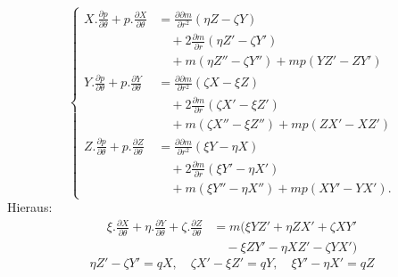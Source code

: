 \begin{equation}\tag{3}
\left\{\begin{aligned}
X.\frac{\partial p}{\partial\theta}+p.\frac{\partial X}{\partial\theta}&=\frac{\partial\partial m}{\partial r^2}(\eta Z-\zeta Y)\\
&\quad+2\frac{\partial m}{\partial r}(\eta Z'-\zeta Y')\\
&\quad+m(\eta Z''-\zeta Y'')+mp(YZ'-ZY')\\
Y.\frac{\partial p}{\partial\theta}+p.\frac{\partial Y}{\partial\theta}&=\frac{\partial\partial m}{\partial r^2}(\zeta X-\xi Z)\\
&\quad+2\frac{\partial m}{\partial r}(\zeta X'-\xi Z')\\
&\quad+m(\zeta X''-\xi Z'')+mp(ZX'-XZ')\\
Z.\frac{\partial p}{\partial\theta}+p.\frac{\partial Z}{\partial\theta}&=\frac{\partial\partial m}{\partial r^2}(\xi Y-\eta X)\\
&\quad+2\frac{\partial m}{\partial r}(\xi Y'-\eta X')\\
&\quad+m(\xi Y''-\eta X'')+mp(XY'-YX').
\end{aligned}\right.
\end{equation}
\indent Hieraus:
\[
\begin{aligned}
\xi.\frac{\partial X}{\partial\theta}+\eta.\frac{\partial Y}{\partial\theta}+\zeta.\frac{\partial Z}{\partial\theta}
&=m(\xi YZ'+\eta ZX'+\zeta XY'\\
&\quad-\xi ZY'-\eta XZ'-\zeta YX')
\end{aligned}
\]
\noindent [oder, da]
\[
\eta Z'-\zeta Y'=qX,\quad\zeta X'-\xi Z'=qY,\quad\xi Y'-\eta X'=qZ
\]
